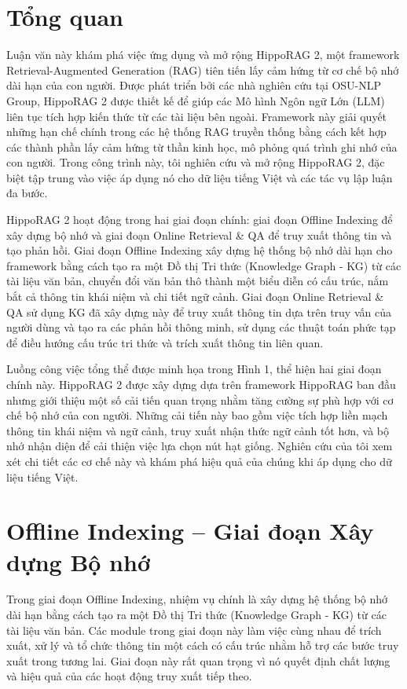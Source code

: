 \documentclass[../main.tex]{subfiles}
\begin{document}
\section{Tổng quan}
Luận văn này khám phá việc ứng dụng và mở rộng HippoRAG 2, một framework Retrieval-Augmented Generation (RAG) tiên tiến lấy cảm hứng từ cơ chế bộ nhớ dài hạn của con người. Được phát triển bởi các nhà nghiên cứu tại OSU-NLP Group, HippoRAG 2 được thiết kế để giúp các Mô hình Ngôn ngữ Lớn (LLM) liên tục tích hợp kiến thức từ các tài liệu bên ngoài. Framework này giải quyết những hạn chế chính trong các hệ thống RAG truyền thống bằng cách kết hợp các thành phần lấy cảm hứng từ thần kinh học, mô phỏng quá trình ghi nhớ của con người. Trong công trình này, tôi nghiên cứu và mở rộng HippoRAG 2, đặc biệt tập trung vào việc áp dụng nó cho dữ liệu tiếng Việt và các tác vụ lập luận đa bước.

HippoRAG 2 hoạt động trong hai giai đoạn chính: giai đoạn Offline Indexing để xây dựng bộ nhớ và giai đoạn Online Retrieval \& QA để truy xuất thông tin và tạo phản hồi. Giai đoạn Offline Indexing xây dựng hệ thống bộ nhớ dài hạn cho framework bằng cách tạo ra một Đồ thị Tri thức (Knowledge Graph - KG) từ các tài liệu văn bản, chuyển đổi văn bản thô thành một biểu diễn có cấu trúc, nắm bắt cả thông tin khái niệm và chi tiết ngữ cảnh. Giai đoạn Online Retrieval \& QA sử dụng KG đã xây dựng này để truy xuất thông tin dựa trên truy vấn của người dùng và tạo ra các phản hồi thông minh, sử dụng các thuật toán phức tạp để điều hướng cấu trúc tri thức và trích xuất thông tin liên quan.

Luồng công việc tổng thể được minh họa trong Hình 1, thể hiện hai giai đoạn chính này. HippoRAG 2 được xây dựng dựa trên framework HippoRAG ban đầu nhưng giới thiệu một số cải tiến quan trọng nhằm tăng cường sự phù hợp với cơ chế bộ nhớ của con người. Những cải tiến này bao gồm việc tích hợp liền mạch thông tin khái niệm và ngữ cảnh, truy xuất nhận thức ngữ cảnh tốt hơn, và bộ nhớ nhận diện để cải thiện việc lựa chọn nút hạt giống. Nghiên cứu của tôi xem xét chi tiết các cơ chế này và khám phá hiệu quả của chúng khi áp dụng cho dữ liệu tiếng Việt.

\section{Offline Indexing – Giai đoạn Xây dựng Bộ nhớ}
Trong giai đoạn Offline Indexing, nhiệm vụ chính là xây dựng hệ thống bộ nhớ dài hạn bằng cách tạo ra một Đồ thị Tri thức (Knowledge Graph - KG) từ các tài liệu văn bản. Các module trong giai đoạn này làm việc cùng nhau để trích xuất, xử lý và tổ chức thông tin một cách có cấu trúc nhằm hỗ trợ các bước truy xuất trong tương lai. Giai đoạn này rất quan trọng vì nó quyết định chất lượng và hiệu quả của các hoạt động truy xuất tiếp theo.
\end{document}
